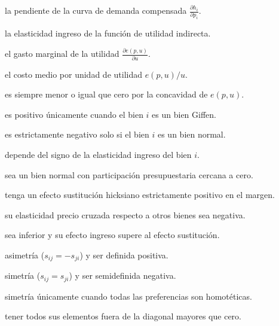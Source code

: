 \begin{opts}
    \item la pendiente de la curva de demanda compensada $\frac{\partial h_i}{\partial p_i}$.
    \item la elasticidad ingreso de la función de utilidad indirecta.
    \item el gasto marginal de la utilidad $\frac{\partial e(p,u)}{\partial u}$.
    \item el costo medio por unidad de utilidad $e(p,u)/u$.
\end{opts}

\begin{opts}
    \item es siempre menor o igual que cero por la concavidad de $e(p,u)$.
    \item es positivo únicamente cuando el bien $i$ es un bien Giffen.
    \item es estrictamente negativo solo si el bien $i$ es un bien normal.
    \item depende del signo de la elasticidad ingreso del bien $i$.
\end{opts}

\begin{opts}
    \item sea un bien normal con participación presupuestaria cercana a cero.
    \item tenga un efecto sustitución hicksiano estrictamente positivo en el margen.
    \item su elasticidad precio cruzada respecto a otros bienes sea negativa.
    \item sea inferior y su efecto ingreso supere al efecto sustitución.
\end{opts}

\begin{opts}
    \item asimetría ($s_{ij}=-s_{ji}$) y ser definida positiva.
    \item simetría ($s_{ij}=s_{ji}$) y ser semidefinida negativa.
    \item simetría únicamente cuando todas las preferencias son homotéticas.
    \item tener todos sus elementos fuera de la diagonal mayores que cero.
\end{opts}


